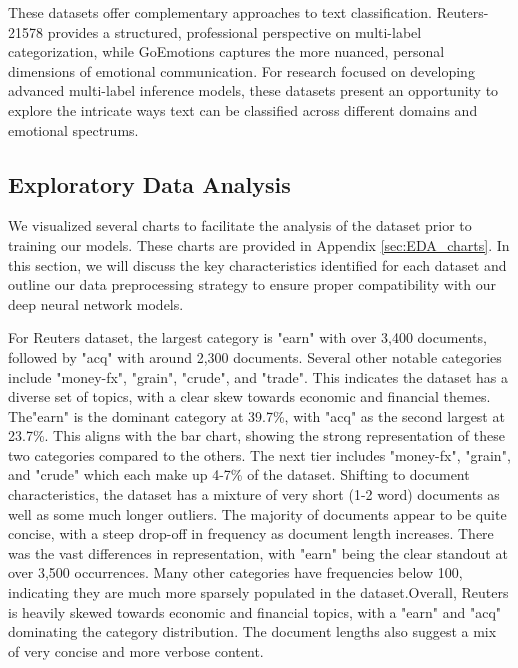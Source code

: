\documentclass{article}
\begin{document}
These datasets offer complementary approaches to text classification. Reuters-21578 provides a structured, professional perspective on multi-label categorization, while GoEmotions captures the more nuanced, personal dimensions of emotional communication. For research focused on developing advanced multi-label inference models, these datasets present an opportunity to explore the intricate ways text can be classified across different domains and emotional spectrums.
\subsection{Exploratory Data Analysis}
We visualized several charts to facilitate the analysis of the dataset prior to training our models. These charts are provided in Appendix \ref{sec:EDA_charts}. In this section, we will discuss the key characteristics identified for each dataset and outline our data preprocessing strategy to ensure proper compatibility with our deep neural network models.

For Reuters dataset, the largest category is "earn" with over 3,400 documents, followed by "acq" with around 2,300 documents. Several other notable categories include "money-fx", "grain", "crude", and "trade". This indicates the dataset has a diverse set of topics, with a clear skew towards economic and financial themes. The"earn" is the dominant category at 39.7\%, with "acq" as the second largest at 23.7\%. This aligns with the bar chart, showing the strong representation of these two categories compared to the others. The next tier includes "money-fx", "grain", and "crude" which each make up 4-7\% of the dataset. Shifting to document characteristics, the dataset has a mixture of very short (1-2 word) documents as well as some much longer outliers. The majority of documents appear to be quite concise, with a steep drop-off in frequency as document length increases. There was the vast differences in representation, with "earn" being the clear standout at over 3,500 occurrences. Many other categories have frequencies below 100, indicating they are much more sparsely populated in the dataset.Overall, Reuters is heavily skewed towards economic and financial topics, with a "earn" and "acq" dominating the category distribution. The document lengths also suggest a mix of very concise and more verbose content. 
\end{document}
